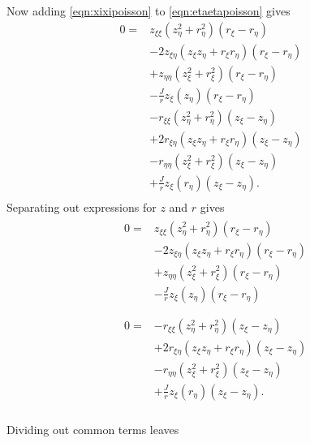 %
Now adding \cref{eqn:xixipoisson} to \cref{eqn:etaetapoisson} gives
%
\begin{equation}
    \begin{aligned}
       0= &z_{\xi\xi} ( z_\eta^2 + r_\eta^2) (r_\xi - r_\eta)\\
		&- 2z_{\xi\eta} (z_\xi z_\eta + r_\xi r_\eta)  (r_\xi - r_\eta)   \\
        &+ z_{\eta\eta} (z_\xi^2 + r_\xi^2)  (r_\xi - r_\eta) \\
        &- \frac{J}{r}z_\xi (z_\eta) (r_\xi - r_\eta) \\
        &-r_{\xi\xi} ( z_\eta^2 + r_\eta^2 )  (z_\xi - z_\eta) \\
		&+ 2r_{\xi\eta} (z_\xi z_\eta + r_\xi  r_\eta) (z_\xi - z_\eta) \\
		&- r_{\eta\eta} (z_\xi^2 + r_\xi^2 )  (z_\xi - z_\eta) \\
        &+ \frac{J}{r}z_\xi (r_\eta) (z_\xi - z_\eta). \\
	\end{aligned}
\end{equation}
%
Separating out expressions for \(z\) and \(r\) gives
%
\begin{subequations}
\begin{align}
    &\begin{split}
       0= &z_{\xi\xi} ( z_\eta^2 + r_\eta^2) (r_\xi - r_\eta)\\
		&- 2z_{\xi\eta} (z_\xi z_\eta + r_\xi r_\eta)  (r_\xi - r_\eta)   \\
        &+ z_{\eta\eta} (z_\xi^2 + r_\xi^2)  (r_\xi - r_\eta) \\
        &- \frac{J}{r}z_\xi (z_\eta) (r_\xi - r_\eta) \\
   \end{split} \\[1em]
    &\begin{split}
        0=&-r_{\xi\xi} ( z_\eta^2 + r_\eta^2 )  (z_\xi - z_\eta) \\
		&+ 2r_{\xi\eta} (z_\xi z_\eta + r_\xi  r_\eta) (z_\xi - z_\eta) \\
		&- r_{\eta\eta} (z_\xi^2 + r_\xi^2 )  (z_\xi - z_\eta) \\
        &+ \frac{J}{r}z_\xi (r_\eta) (z_\xi - z_\eta). \\
    \end{split}
\end{align}
\end{subequations}

Dividing out common terms leaves


